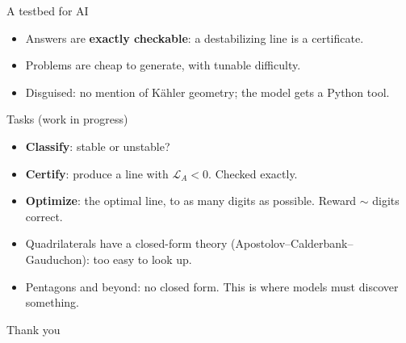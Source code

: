 \documentclass[aspectratio=169,11pt]{beamer}
\newcommand{\Lfun}{\mathcal{L}}
\newcommand{\hl}[1]{\textcolor{accent}{#1}}
\newcommand{\aside}[1]{{\small\color{muted}#1}}
\begin{document}

\begin{frame}{A testbed for AI}
  \begin{itemize}
    \item Answers are \textbf{exactly checkable}: a destabilizing line is a certificate.
    \item Problems are cheap to generate, with tunable difficulty.
    \item Disguised: no mention of Kähler geometry; the model gets a Python tool.
  \end{itemize}
  \vspace{0.8em}
  \begin{center}
  \end{center}
\end{frame}

\begin{frame}{Tasks \aside{(work in progress)}}
  \begin{itemize}
    \item \textbf{Classify}: stable or unstable?
    \item \textbf{Certify}: produce a line with $\Lfun_A < 0$. \aside{Checked exactly.}
    \item \textbf{Optimize}: the optimal line, to as many digits as possible. \aside{Reward $\sim$ digits correct.}
  \end{itemize}
  \vspace{1em}
  \begin{itemize}
    \item Quadrilaterals have a closed-form theory \aside{(Apostolov--Calderbank--Gauduchon)}: too easy to look up.
    \item Pentagons and beyond: no closed form. \hl{This is where models must discover something.}
  \end{itemize}
\end{frame}

\begin{frame}[plain]
  \begin{center}
    \Large Thank you
  \end{center}
\end{frame}
\end{document}
